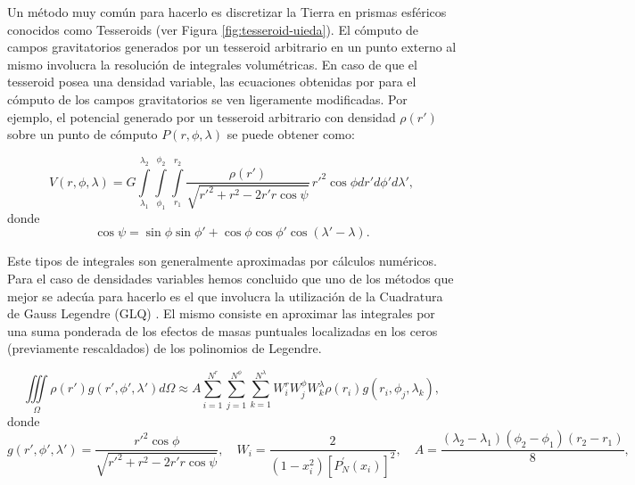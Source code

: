 \documentclass[a4paper,10pt]{article}
\begin{document}
Un método muy común para hacerlo es discretizar la Tierra en prismas esféricos conocidos como Tesseroids (ver Figura \ref{fig:tesseroid-uieda}).
El cómputo de campos gravitatorios generados por un tesseroid arbitrario en un punto externo al mismo involucra la resolución de integrales volumétricas.
En caso de que el tesseroid posea una densidad variable, las ecuaciones obtenidas por \citet{Grombein2013} \citep[ver también][]{Uieda2016} para el cómputo de los campos gravitatorios se ven ligeramente modificadas. Por ejemplo, el potencial generado por un tesseroid arbitrario con densidad $\rho(r')$ sobre un punto de cómputo $P(r, \phi, \lambda)$ se puede obtener como:

\begin{equation}
    V(r,\phi,\lambda) = G 
    \int\limits_{\lambda_1}^{\lambda_2}
    \int\limits_{\phi_1}^{\phi_2}
    \int\limits_{r_1}^{r_2}
    \frac{\rho(r')}{\sqrt{{r'}^2 + r^2 - 2 r' r \cos \psi}} \, 
    r'^2 \cos \phi  dr' d\phi' d\lambda',
\label{eq:tesseroid-pot}
\end{equation}
\noindent donde
\begin{equation}
    \cos\psi = \sin\phi\sin\phi' + \cos\phi\cos\phi'
                 \cos(\lambda' - \lambda).
\label{eq:cospsi}
\end{equation}

Este tipos de integrales son generalmente aproximadas por cálculos numéricos.
Para el caso de densidades variables hemos concluido que uno de los métodos que mejor se adecúa para hacerlo es el que involucra la utilización de la Cuadratura de Gauss Legendre (GLQ) \citep{Asgharzadeh2007, Uieda2016, Uieda2017}.
El mismo consiste en aproximar las integrales por una suma ponderada de los efectos de masas puntuales localizadas en los ceros (previamente rescaldados) de los polinomios de Legendre.

\begin{equation}
    \iiint\limits_\Omega \rho(r') g(r', \phi', \lambda') d\Omega \approx
    A 
    \sum\limits_{i=1}^{N^r}
    \sum\limits_{j=1}^{N^\phi}
    \sum\limits_{k=1}^{N^\lambda}
    W_i^r W_j^\phi W_k^\lambda \rho(r_i) g(r_i, \phi_j, \lambda_k),
\label{eq:glq-var-dens}
\end{equation}
\noindent donde
\begin{equation}
    g(r', \phi', \lambda') =
    \frac{r'^2 \cos \phi}{\sqrt{{r'}^2 + r^2 - 2 r' r \cos \psi}},
    \quad
    W_i = \frac{2}{(1-x_i^2)[P_N^\prime(x_i)]^2},
    \quad
    A = \frac{(\lambda_2 - \lambda_1)(\phi_2 - \phi_1)(r_2 - r_1)}{8},
\end{equation}
\end{document}

